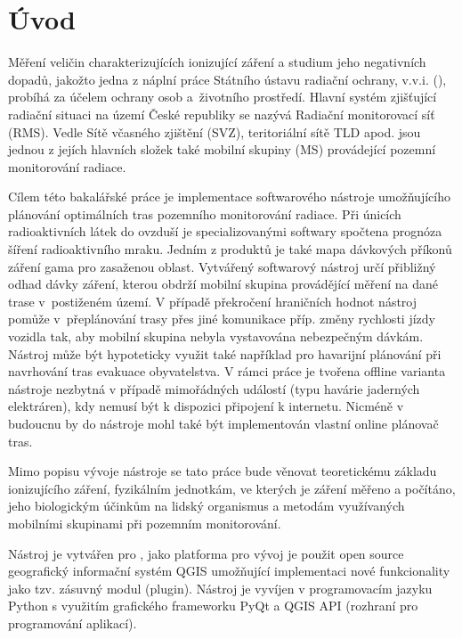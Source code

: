 \chapter{Úvod}
\label{1-uvod}
Měření veličin charakterizujících ionizující záření a studium jeho negativních dopadů, jakožto jedna z náplní práce Státního ústavu radiační ochrany, v.v.i. (), probíhá za účelem ochrany osob a~životního prostředí. 
Hlavní systém zjišťující radiační situaci na území České republiky se nazývá Radiační monitorovací síť (RMS). Vedle Sítě včasného zjištění (SVZ), teritoriální sítě TLD apod. jsou jednou z jejích hlavních složek také mobilní skupiny (MS) provádející pozemní monitorování radiace. \cite{suroRMS}

Cílem této bakalářské práce je implementace softwarového nástroje umožňujícího plánování optimálních tras pozemního monitorování radiace. Při únicích radioaktivních látek do ovzduší je specializovanými softwary spočtena prognóza šíření radioaktivního mraku. Jedním z produktů je také mapa dávkových příkonů záření gama pro zasaženou oblast. Vytvářený softwarový nástroj určí přibližný odhad dávky záření, kterou obdrží mobilní skupina provádějící měření na dané trase v~postiženém území. V případě překročení hraničních hodnot nástroj pomůže v~přeplánování trasy přes jiné komunikace příp. změny rychlosti jízdy vozidla tak, aby mobilní skupina nebyla vystavována nebezpečným dávkám. 
Nástroj může být hypoteticky využit také například pro havarijní plánování při navrhování tras evakuace obyvatelstva. V rámci práce je tvořena offline varianta nástroje nezbytná v případě mimořádných událostí (typu havárie jaderných elektráren), kdy nemusí být k dispozici připojení k internetu. Nicméně v budoucnu by do nástroje mohl také být implementován vlastní online plánovač tras. 

Mimo popisu vývoje nástroje se tato práce bude věnovat teoretickému základu ionizujícího záření, fyzikálním jednotkám, ve kterých je záření měřeno a počítáno, jeho biologickým účinkům na lidský organismus a metodám využívaných mobilními skupinami při pozemním monitorování. 

Nástroj je vytvářen pro , jako platforma pro vývoj je použit open source geografický informační systém QGIS umožňující implementaci nové funkcionality jako tzv. zásuvný modul (plugin). Nástroj je vyvíjen v programovacím jazyku Python s využitím grafického frameworku PyQt a QGIS API (rozhraní pro programování aplikací).    







